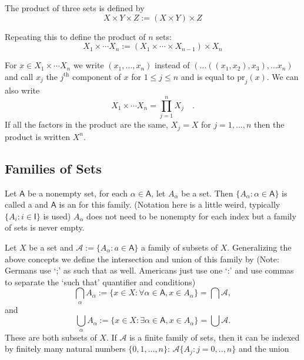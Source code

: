 The product of three sets is defined by
$$
X \times Y \times Z := (X \times Y) \times Z
$$

Repeating this to define the product of $n$ sets:
$$
X_1 \times \cdots X_n := (X_1 \times \cdots \times X_{n-1}) \times X_n
$$

For $x \in X_1 \times \cdots X_n$ we write $(x_1,\dots,x_n)$ instead of $(\dots((x_1,x_2),x_3),...x_n)$ and call $x_j$ the $j^\text{th}$ component of $x$ for $1 \leq j \leq n$ and is equal to $\text{pr}_j(x)$. We can also write
$$
X_1 \times \cdots X_n = \prod_{j=1}^n X_j\quad.
$$
\noindent If all the factors in the product are the same, $X_j = X$ for $j = 1,...,n$ then the product is written $X^n$.

\subsection{Families of Sets}

Let $\mathsf{A}$ be a nonempty set, for each $\alpha \in \mathsf{A}$, let $A_\alpha$ be a set. Then $\{A_\alpha : \alpha \in \mathsf{A}\}$ is called a  and $\mathsf{A}$ is an  for this family. (Notation here is a little weird, typically $\{ A_i :i \in \mathsf{I}\}$ is used) $A_\alpha$ does not need to be nonempty for each index but a family of sets is never empty.

Let $X$ be a set and $\mathcal{A} := \{A_\alpha : a \in \mathsf{A}\}$ a family of subsets of $X$. Generalizing the above concepts we define the intersection and union of this family by (Note: Germans use `;' as such that as well. Americans just use one `:' and use commas to separate the `such that' quantifier and conditions)
$$
\bigcap_\alpha A_\alpha := 
\{x \in X: \forall \alpha \in \mathsf{A}, x \in A_\alpha\}   
= \bigcap \mathcal{A},
$$
and 
$$
\bigcup_\alpha A_\alpha := \{x \in X: \exists \alpha \in \mathsf{A}, x \in A_\alpha\}
= \bigcup \mathcal{A}.
$$
These are both subsets of $X$. If $\mathcal{A}$ is a finite family of sets, then it can be indexed by finitely many natural numbers $\{0,1,...,n\}$: $\mathcal{A} \{A_j: j=0,..,n\}$ and the union

